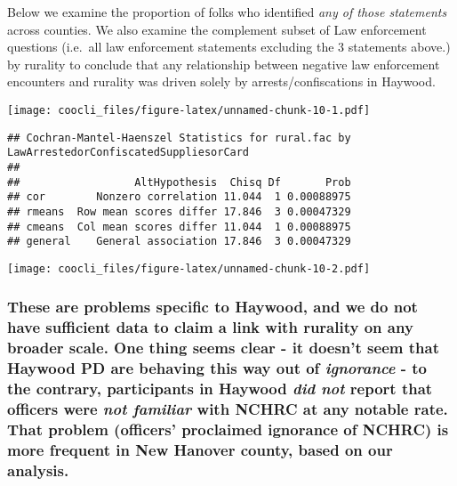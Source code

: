 \documentclass[
]{book}
\begin{document}
Below we examine the proportion of folks who identified \emph{any of those statements} across counties. We also examine the complement subset of Law enforcement questions (i.e.~all law enforcement statements excluding the 3 statements above.) by rurality to conclude that any relationship between negative law enforcement encounters and rurality was driven solely by arrests/confiscations in Haywood.

\texttt{[image: coocli\_files/figure-latex/unnamed-chunk-10-1.pdf]}

\begin{verbatim}
## Cochran-Mantel-Haenszel Statistics for rural.fac by LawArrestedorConfiscatedSuppliesorCard 
## 
##                  AltHypothesis  Chisq Df       Prob
## cor        Nonzero correlation 11.044  1 0.00088975
## rmeans  Row mean scores differ 17.846  3 0.00047329
## cmeans  Col mean scores differ 11.044  1 0.00088975
## general    General association 17.846  3 0.00047329
\end{verbatim}

\texttt{[image: coocli\_files/figure-latex/unnamed-chunk-10-2.pdf]}

\hypertarget{these-are-problems-specific-to-haywood-and-we-do-not-have-sufficient-data-to-claim-a-link-with-rurality-on-any-broader-scale.-one-thing-seems-clear---it-doesnt-seem-that-haywood-pd-are-behaving-this-way-out-of-ignorance---to-the-contrary-participants-in-haywood-did-not-report-that-officers-were-not-familiar-with-nchrc-at-any-notable-rate.-that-problem-officers-proclaimed-ignorance-of-nchrc-is-more-frequent-in-new-hanover-county-based-on-our-analysis.}{%
\subsubsection{\texorpdfstring{These are problems specific to Haywood, and we do not have sufficient data to claim a link with rurality on any broader scale. One thing seems clear - it doesn't seem that Haywood PD are behaving this way out of \emph{ignorance} - to the contrary, participants in Haywood \emph{did not} report that officers were \emph{not familiar} with NCHRC at any notable rate. That problem (officers' proclaimed ignorance of NCHRC) is more frequent in New Hanover county, based on our analysis.}{These are problems specific to Haywood, and we do not have sufficient data to claim a link with rurality on any broader scale. One thing seems clear - it doesn't seem that Haywood PD are behaving this way out of ignorance - to the contrary, participants in Haywood did not report that officers were not familiar with NCHRC at any notable rate. That problem (officers' proclaimed ignorance of NCHRC) is more frequent in New Hanover county, based on our analysis.}}\label{these-are-problems-specific-to-haywood-and-we-do-not-have-sufficient-data-to-claim-a-link-with-rurality-on-any-broader-scale.-one-thing-seems-clear---it-doesnt-seem-that-haywood-pd-are-behaving-this-way-out-of-ignorance---to-the-contrary-participants-in-haywood-did-not-report-that-officers-were-not-familiar-with-nchrc-at-any-notable-rate.-that-problem-officers-proclaimed-ignorance-of-nchrc-is-more-frequent-in-new-hanover-county-based-on-our-analysis.}}
\end{document}
